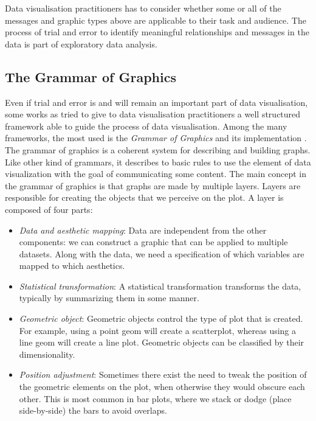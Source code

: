 \documentclass[]{book}
\providecommand{\tightlist}{%
  \setlength{\itemsep}{0pt}\setlength{\parskip}{0pt}}
\theoremstyle{definition}
\theoremstyle{definition}
\theoremstyle{definition}
\theoremstyle{remark}
\begin{document}
Data visualisation practitioners has to consider whether some or all of
the messages and graphic types above are applicable to their task and
audience. The process of trial and error to identify meaningful
relationships and messages in the data is part of exploratory data
analysis.

\subsection{The Grammar of Graphics}\label{the-grammar-of-graphics}

Even if trial and error is and will remain an important part of data
visualisation, some works as tried to give to data visualisation
practitioners a well structured framework able to guide the process of
data visualisation. Among the many frameworks, the most used is the
\emph{Grammar of Graphics} \citep{wilkinson2006grammar} and its
implementation \citep{wickham2008ggplot2}. The grammar of graphics is a
coherent system for describing and building graphs. Like other kind of
grammars, it describes to basic rules to use the element of data
visualization with the goal of communicating some content. The main
concept in the grammar of graphics is that graphs are made by multiple
layers. Layers are responsible for creating the objects that we perceive
on the plot. A layer is composed of four parts:

\begin{itemize}
\tightlist
\item
  \emph{Data and aesthetic mapping}: Data are independent from the other
  components: we can construct a graphic that can be applied to multiple
  datasets. Along with the data, we need a specification of which
  variables are mapped to which aesthetics.
\item
  \emph{Statistical transformation}: A statistical transformation
  transforms the data, typically by summarizing them in some manner.
\item
  \emph{Geometric object}: Geometric objects control the type of plot
  that is created. For example, using a point geom will create a
  scatterplot, whereas using a line geom will create a line plot.
  Geometric objects can be classified by their dimensionality.
\item
  \emph{Position adjustment}: Sometimes there exist the need to tweak
  the position of the geometric elements on the plot, when otherwise
  they would obscure each other. This is most common in bar plots, where
  we stack or dodge (place side-by-side) the bars to avoid overlaps.
\end{itemize}
\end{document}
